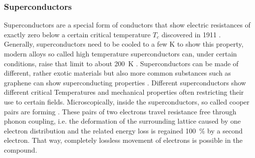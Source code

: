             \subsubsection{Superconductors}
            \label{sec:theory:superconductor}
            Superconductors are a special form of conductors that show electric resistances of exactly zero below a certain critical temperature $T_c$ discovered in 1911 \cite{onnes_resistance_nodate}. Generally, superconductors need to be cooled to a few \si{\kelvin} to show this property, modern alloys so called high temperature superconductors can, under certain conditions, raise that limit to about \SI{200}{\kelvin} \cite{drozdov_conventional_2015}. Superconductors can be made of different, rather exotic materials but also more common substances such as graphene can show superconducting properties \cite{cao_unconventional_2018}. Different superconductors show different critical Temperatures and mechanical properties often restricting their use to certain fields. Microscopically, inside the superconductors, so called cooper pairs are forming \cite{bardeen_theory_1957}. These pairs of two electrons travel resistance free through phonon coupling, i.e. the deformation of the surrounding lattice caused by one electron distribution and the related energy loss is regained \SI{100}{\percent} by a second electron. That way, completely lossless movement of electrons is possible in the compound.
